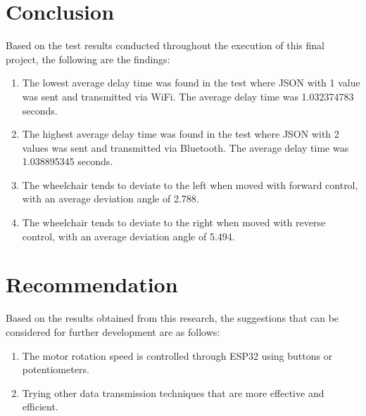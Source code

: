 \section{Conclusion}
\label{sec:kesimpulan}

Based on the test results conducted throughout the execution of this final project, the following are the findings:

\begin{enumerate}[nolistsep]

  \item The lowest average delay time was found in the test where JSON with 1 value was sent and transmitted via WiFi. The average delay time was 1.032374783 seconds.
  
  \item The highest average delay time was found in the test where JSON with 2 values was sent and transmitted via Bluetooth. The average delay time was 1.038895345 seconds.
  
  \item The wheelchair tends to deviate to the left when moved with forward control, with an average deviation angle of 2.788\textdegree.
  
  \item The wheelchair tends to deviate to the right when moved with reverse control, with an average deviation angle of 5.494\textdegree.

\end{enumerate}

\section{Recommendation}
\label{chap:saran}

Based on the results obtained from this research, the suggestions that can be considered for further development are as follows:

\begin{enumerate}[nolistsep]

  \item The motor rotation speed is controlled through ESP32 using buttons or potentiometers.
  
  \item Trying other data transmission techniques that are more effective and efficient.

\end{enumerate}
